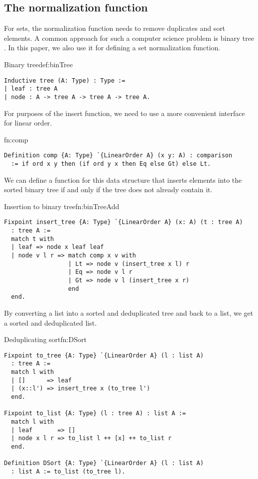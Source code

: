 \subsection{The normalization function}
For sets, the normalization function needs to remove duplicates and sort elements. A common approach for such a computer science problem is binary tree \cite{knuth}. In this paper, we also use it for defining a set normalization function.
\begin{defi}{Binary tree}{def:binTree}
\begin{verbatim}
Inductive tree (A: Type) : Type :=
| leaf : tree A
| node : A -> tree A -> tree A -> tree A.
\end{verbatim}
\end{defi}
For purposes of the insert function, we need to use a more convenient interface for linear order.
\begin{func}{}{fn:comp}
\begin{verbatim}
Definition comp {A: Type} `{LinearOrder A} (x y: A) : comparison 
  := if ord x y then (if ord y x then Eq else Gt) else Lt.
\end{verbatim}
\end{func}
We can define a function for this data structure that inserts elements into the sorted binary tree if and only if the tree does not already contain it.
\begin{func}[D]{Insertion to binary tree}{fn:binTreeAdd}
\begin{verbatim}
Fixpoint insert_tree {A: Type} `{LinearOrder A} (x: A) (t : tree A) 
  : tree A :=
  match t with
  | leaf => node x leaf leaf
  | node v l r => match comp x v with
                  | Lt => node v (insert_tree x l) r
                  | Eq => node v l r
                  | Gt => node v l (insert_tree x r)
                  end
  end.
\end{verbatim}
\end{func}
By converting a list into a sorted and deduplicated tree and back to a list, we get a sorted and deduplicated list.
\begin{func}{Deduplicating sort}{fn:DSort}
\begin{verbatim}
Fixpoint to_tree {A: Type} `{LinearOrder A} (l : list A) 
  : tree A := 
  match l with
  | []      => leaf
  | (x::l') => insert_tree x (to_tree l')
  end.

Fixpoint to_list {A: Type} (l : tree A) : list A := 
  match l with
  | leaf       => []
  | node x l r => to_list l ++ [x] ++ to_list r
  end.

Definition DSort {A: Type} `{LinearOrder A} (l : list A) 
  : list A := to_list (to_tree l).
\end{verbatim}
\end{func}
